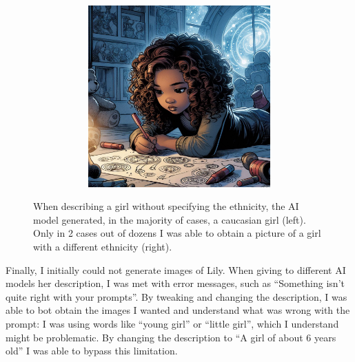 \documentclass[a4paper,11pt]{article}
\begin{document}
\begin{figure}
\begin{subfigure}{0.353\textwidth}
\begin{subfigure}{1\textwidth}
        \end{subfigure}\\
        \begin{subfigure}{1\textwidth}
            \includegraphics[width=\textwidth]{figures/bias2.jpeg}
        \end{subfigure}
    \end{subfigure}
            
    \caption{When describing a girl without specifying the ethnicity, the AI model generated, in the majority of cases, a caucasian girl (left). Only in 2 cases out of dozens I was able to obtain a picture of a girl with a different ethnicity (right).}
    \label{fig:bias}
\end{figure}

Finally, I initially could not generate images of Lily. When giving to different AI models her description, I was met with error messages, such as ``Something isn't quite right with your prompts''. By tweaking and changing the description, I was able to bot obtain the images I wanted and understand what was wrong with the prompt: I was using words like ``young girl'' or ``little girl'', which I understand might be problematic. By changing the description to ``A girl of about 6 years old'' I was able to bypass this limitation.
\end{document}
